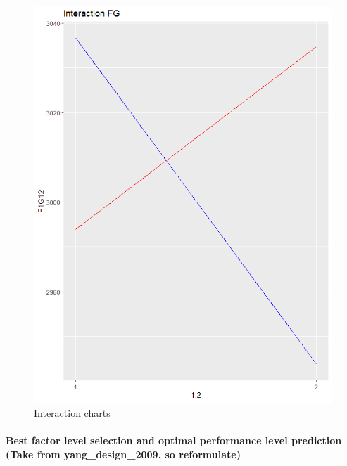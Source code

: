 \begin{figure}[H]
\begin{minipage}[b]{0.33\linewidth}
		\includegraphics[width=1\linewidth]{simulations/taguchi/plots/interaction_fg} 
	\end{minipage}
	\caption{Interaction charts}
\end{figure}


\paragraph{Best factor level selection and optimal performance level prediction (Take from yang\_design\_2009, so reformulate)}

